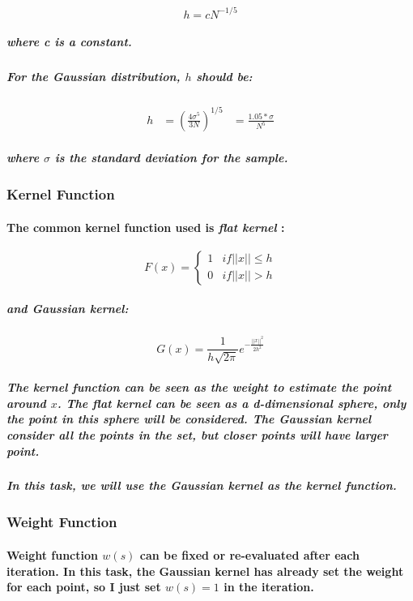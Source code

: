 \documentclass{article}
\begin{document}
\begin{equation}
    h = cN^{-1/5}
\end{equation}
\subparagraph{
    where c is a constant.
}
\subparagraph{
    For the Gaussian distribution, $h$ should be:
}

\begin{equation}
\begin{aligned}
    h &= (\frac{4\sigma^5}{3N})^{1/5}
&=\frac{1.05 * \sigma}{N^5}
\end{aligned}
\end{equation}
\subparagraph{where $\sigma$ is the standard deviation for the sample.}

\subsubsection{Kernel Function}
\paragraph{
    The common kernel function used is \textit{flat kernel} :
}

\begin{equation}
    F(x) =
    \begin{cases}
        1 &if ||x|| \le h\\
        0 &if ||x|| > h
        \end{cases}
\end{equation}
\subparagraph{and \textit{Gaussian kernel}:}

\begin{equation}
    G(x) = \frac{1}{h\sqrt{2\pi}} e^{-\frac{||x||^2}{2h^2}}
\end{equation}

\subparagraph{
    The kernel function can be seen as the weight to estimate the point around $x$.
    The \textit{flat kernel} can be seen as a d-dimensional sphere, only the point in this sphere will be considered.
    The \textit{Gaussian kernel} consider all the points in the set, but closer points will have larger point.
}
\subparagraph{
    In this task, we will use the \textit{Gaussian kernel} as the kernel function.
}

\subsubsection{Weight Function}
\paragraph{
    Weight function $w(s)$ can be fixed or re-evaluated after each iteration. In this task, the Gaussian kernel has already
    set the weight for each point, so I just set $w(s) = 1$ in the iteration.
}
\end{document}
